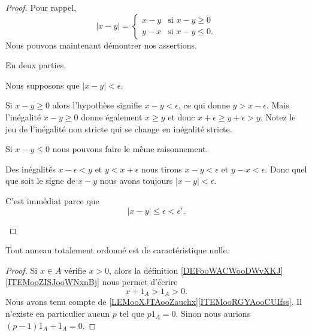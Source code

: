 \begin{proof}
	Pour rappel,
	\begin{equation}
		| x-y |=\begin{cases}
			x-y & \text{si } x-y\geq 0  \\
			y-x & \text{si } x-y\leq 0.
		\end{cases}
	\end{equation}
	Nous pouvons maintenant démontrer nos assertions.
	\begin{subproof}
		\spitem[\ref{ITEMooXJGVooSebiip}]
		En deux parties.
		\begin{subproof}
			\spitem[\( \Rightarrow\)]
			Nous supposons que \( | x-y |<\epsilon\).

			Si \( x-y\geq 0\) alors l'hypothèse signifie \( x-y<\epsilon\), ce qui donne \( y>x-\epsilon\). Mais l'inégalité \( x-y\geq 0\) donne également \( x\geq y\) et donc \( x+\epsilon\geq y+\epsilon>y\). Notez le jeu de l'inégalité non stricte qui se change en inégalité stricte.

			Si \( x-y\leq 0\) nous pouvons faire le même raisonnement.

			\spitem[\( \Leftarrow\)]
			Des inégalités \( x-\epsilon<y\) et \( y<x+\epsilon\) nous tirons \( x-y<\epsilon\) et \( y-x<\epsilon\). Donc quel que soit le signe de \( x-y\) nous avons toujours \( | x-y |<\epsilon\).
		\end{subproof}

		\spitem[\ref{ITEMooRUBBooRayiMs}]

		C'est immédiat parce que
		\begin{equation}
			| x-y |\leq \epsilon<\epsilon'.
		\end{equation}
	\end{subproof}
\end{proof}


\begin{lemma}       \label{LEMooVZNCooRJatKK}
	Tout anneau totalement ordonné est de caractéristique nulle.
\end{lemma}

\begin{proof}
	Si \( x\in A\) vérifie \( x>0\), alors la définition \ref{DEFooWACWooDWvXKJ}\ref{ITEMooZISJooWNxnBj} nous permet d'écrire
	\begin{equation}
		x+1_A>1_A>0.
	\end{equation}
	Nous avons tenu compte de \ref{LEMooXJTAooZauchx}\ref{ITEMooRGYAooCUIfss}. Il n'existe en particulier aucun \( p\) tel que \( p1_A=0\). Sinon nous aurions \( (p-1)1_A+1_A=0\).
\end{proof}

